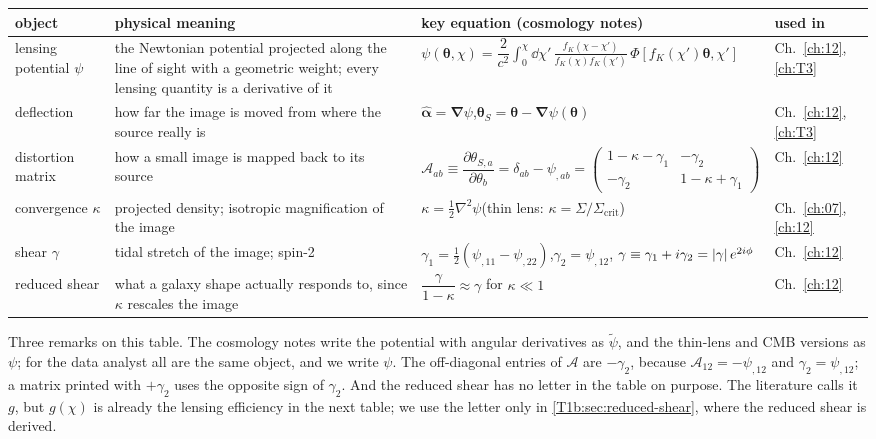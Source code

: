 \begin{center}
\small
\renewcommand{\arraystretch}{1.3}
\begin{tabularx}{\linewidth}{@{}>{\raggedright\arraybackslash}p{2.0cm}
                               >{\raggedright\arraybackslash}X
                               >{\raggedright\arraybackslash}p{6.8cm}
                               >{\raggedright\arraybackslash}p{1.35cm}@{}}
\toprule
object & physical meaning & key equation (cosmology notes) & used in\\\midrule
lensing potential $\psi$ & the Newtonian potential projected along the line of sight with a geometric weight; every lensing quantity is a derivative of it &
$\psi(\bm\theta,\chi)=\dfrac{2}{c^2}\displaystyle\int_0^\chi\!\dd\chi'\,\frac{f_K(\chi-\chi')}{f_K(\chi)f_K(\chi')}\,\Phi[f_K(\chi')\bm\theta,\chi']$ &
Ch.~\ref{ch:12}, \ref{ch:T3}\\
deflection & how far the image is moved from where the source really is &
$\hat{\bm\alpha}=\bm\nabla\psi$,\quad $\bm\theta_S=\bm\theta-\bm\nabla\psi(\bm\theta)$ &
Ch.~\ref{ch:12}, \ref{ch:T3}\\
distortion matrix & how a small image is mapped back to its source &
$\mathcal A_{ab}\equiv\dfrac{\partial\theta_{S,a}}{\partial\theta_b}=\delta_{ab}-\psi_{,ab}=\begin{pmatrix}1-\kappa-\gamma_1&-\gamma_2\\-\gamma_2&1-\kappa+\gamma_1\end{pmatrix}$ &
Ch.~\ref{ch:12}\\
convergence $\kappa$ & projected density; isotropic magnification of the image &
$\kappa=\tfrac12\nabla^2\psi$\quad (thin lens: $\kappa=\Sigma/\Sigma_{\mathrm{crit}}$) &
Ch.~\ref{ch:07}, \ref{ch:12}\\
shear $\gamma$ & tidal stretch of the image; spin-2 &
$\gamma_1=\tfrac12(\psi_{,11}-\psi_{,22})$,\quad $\gamma_2=\psi_{,12}$,\newline
$\gamma\equiv\gamma_1+i\gamma_2=\left\lvert \gamma\right\rvert e^{2i\phi}$ &
Ch.~\ref{ch:12}\\
reduced shear & what a galaxy shape actually responds to, since $\kappa$ rescales the image &
$\dfrac{\gamma}{1-\kappa}\approx\gamma$ for $\kappa\ll1$ &
Ch.~\ref{ch:12}\\
\bottomrule
\end{tabularx}
\end{center}

Three remarks on this table. The cosmology notes write the potential with angular derivatives as $\tilde\psi$, and the thin-lens and CMB versions as $\psi$; for the data analyst all are the same object, and we write $\psi$. The off-diagonal entries of $\mathcal A$ are $-\gamma_2$, because $\mathcal A_{12}=-\psi_{,12}$ and $\gamma_2=\psi_{,12}$; a matrix printed with $+\gamma_2$ uses the opposite sign of $\gamma_2$. And the reduced shear has no letter in the table on purpose. The literature calls it $g$, but $g(\chi)$ is already the lensing efficiency in the next table; we use the letter only in \cref{T1b:sec:reduced-shear}, where the reduced shear is derived.

